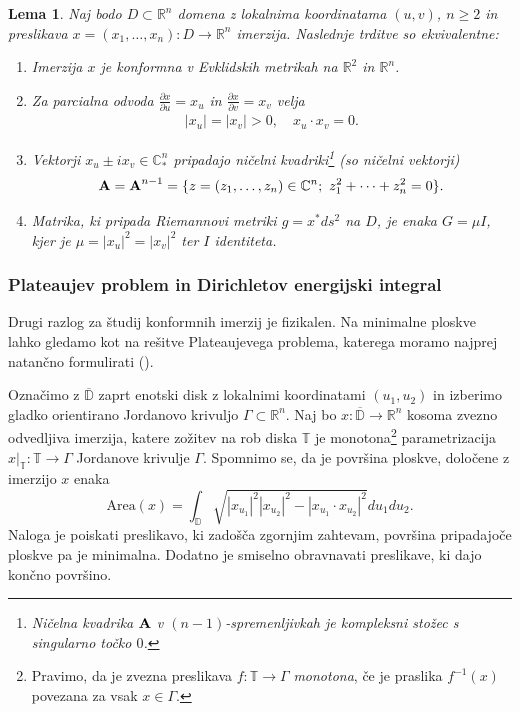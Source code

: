 \documentclass[12pt,a4paper,twoside]{article}
\theoremstyle{definition} %
\theoremstyle{plain} %
\newtheorem{lema}[definicija]{Lema}
\numberwithin{equation}{section}  %
\begin{document}
\begin{lema} \label{lema:konform-ekvivalence}
Naj bodo $D \subset \mathbb{R}^{n}$ domena z lokalnima koordinatama $(u,v)$, $n \geq 2$ in preslikava $x = (x_{1}, \dots , x_{n}) \colon D \to \mathbb{R}^{n}$ imerzija. Naslednje trditve so ekvivalentne:
\begin{enumerate}
	\item Imerzija $x$ je konformna v Evklidskih metrikah na $\mathbb{R}^2$ in $\mathbb{R}^{n}$.
	\item Za parcialna odvoda $\frac{\partial x}{\partial u} = x_{u}$ in $\frac{\partial x}{\partial v} = x_{v}$ velja
		\begin{gather}
		|x_{u}| = |x_{v}| > 0, \quad x_{u} \cdot x_{v} = 0.
		\end{gather}
	\item Vektorji $x_{u} \pm ix_{v} \in \mathbb{C}_{*}^{n}$ pripadajo \emph{ničelni kvadriki}\footnote{Ničelna kvadrika $\textbf{\textup{A}}$ v $(n-1)$-spremenljivkah je kompleksni stožec s singularno točko $0$.} (so \emph{ničelni vektorji})
		\begin{gather}
		\textbf{\textup{A}} = \textbf{\textup{A}}^{n-1} = \{ z=(z_{1}, \dots , z_{n}) \in \mathbb{C}^{n}; \ z_{1}^2 + \cdots + z_{n}^2 = 0 \}.
		\end{gather}
	\item Matrika, ki pripada Riemannovi metriki $g = x^{*}ds^2$ na $D$, je enaka $G = \mu I$, kjer je $\mu = |x_{u}|^2 = |x_{v}|^2$ ter $I$ identiteta.
\end{enumerate}
\end{lema}

\subsubsection{Plateaujev problem in Dirichletov energijski integral}
%
Drugi razlog za študij konformnih imerzij je fizikalen. Na minimalne ploskve lahko gledamo kot na rešitve Plateaujevega problema, katerega moramo najprej natančno formulirati (\cite[Section~2.1]{lawson1980lectures}).

Označimo z $\overline{\mathbb{D}}$ zaprt enotski disk z lokalnimi koordinatami $(u_{1}, u_{2})$ in izberimo gladko orientirano Jordanovo krivuljo $\Gamma \subset \mathbb{R}^{n}$.
Naj bo $x \colon \overline{\mathbb{D}} \to \mathbb{R}^{n}$ kosoma zvezno odvedljiva imerzija, katere zožitev na rob diska $\mathbb{T}$ je monotona\footnote{Pravimo, da je zvezna preslikava $f \colon \mathbb{T} \to \Gamma$ \emph{monotona}, če je praslika $f^{-1}(x)$ povezana za vsak $x \in \Gamma$.} parametrizacija $x|_{\mathbb{T}} \colon \mathbb{T} \to \Gamma$ Jordanove krivulje $\Gamma$.
Spomnimo se, da je površina ploskve, določene z imerzijo $x$ enaka
\begin{equation} \label{eq:area}
\text{Area}(x) = \int_{\mathbb{D}} \sqrt{|x_{u_1}|^2 |x_{u_2}|^2 - |x_{u_1} \cdot x_{u_2}|^2} du_{1}du_{2}.
\end{equation}
Naloga je poiskati preslikavo, ki zadošča zgornjim zahtevam, površina pripadajoče ploskve pa je minimalna. Dodatno je smiselno obravnavati preslikave, ki dajo končno površino.
\end{document}
